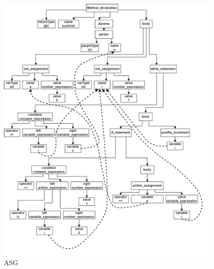 \begin{figure}[h]
	\center
	\includegraphics [scale=0.85] {my_folder/images/my/6}
	\caption{ASG}
	\label{fig:6}  
\end{figure}
